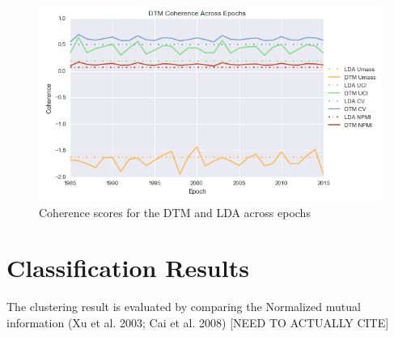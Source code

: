 \begin{figure}[!htb]
\centering
\includegraphics[width=130mm,scale=0.45]{Figures/DTMCoherences}
\decoRule
\caption[EpochCoherences]{Coherence scores for the DTM and LDA across epochs}
\label{fig:EpochCoherences}
\end{figure}


\section{Classification Results}

The clustering result is evaluated by comparing the Normalized mutual information (Xu et al. 2003; Cai et al. 2008) [NEED TO ACTUALLY CITE]



